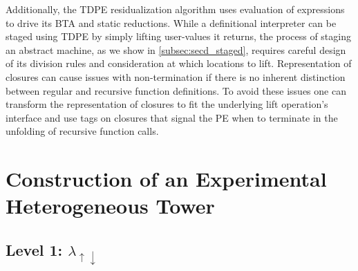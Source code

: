 \documentclass[a4paper,12pt,twoside,openright]{report}
\theoremstyle{definition}
\newcommand{\mslang}{$\lambda_{\uparrow\downarrow}$}
\begin{document}
Additionally, the TDPE residualization algorithm uses evaluation of expressions to drive its BTA and static reductions. While a definitional interpreter can be staged using TDPE by simply lifting user-values it returns, the process of staging an abstract machine, as we show in \ref{subsec:secd_staged}, requires careful design of its division rules and consideration at which locations to lift. Representation of closures can cause issues with non-termination if there is no inherent distinction between regular and recursive function definitions. To avoid these issues one can transform the representation of closures to fit the underlying lift operation's interface and use tags on closures that signal the PE when to terminate in the unfolding of recursive function calls.





\section{Construction of an Experimental Heterogeneous Tower}\label{sec:tower}
\subsection{Level 1: \texorpdfstring{\mslang}{Lg}}\label{sec:mslang}
\end{document}
